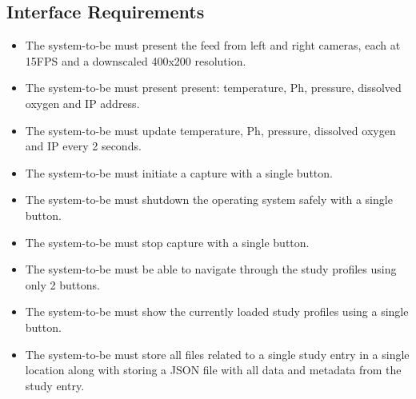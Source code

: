 \subsection{Interface Requirements}
\begin{itemize}
	\item The system-to-be must present the feed from left and right cameras, each at 15FPS and a downscaled 400x200 resolution.
	\item The system-to-be must present present: temperature, Ph, pressure, dissolved oxygen and IP address.
	\item The system-to-be must update temperature, Ph, pressure, dissolved oxygen and IP every 2 seconds.
	\item The system-to-be must initiate a capture with a single button.
	\item The system-to-be must shutdown the operating system safely with a single button.
	\item The system-to-be must stop capture with a single button.
	\item The system-to-be must be able to navigate through the study profiles using only 2 buttons.
	\item The system-to-be must show the currently loaded study profiles using a single button.
	\item The system-to-be must store all files related to a single study entry in a single location along with storing a JSON file with all data and metadata from the study entry.
\end{itemize}